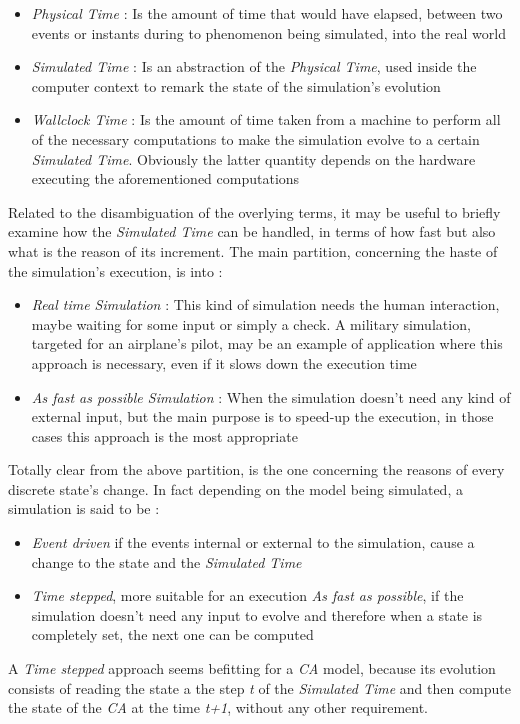 \documentclass[12pt,a4paper,fleqn]{report}
\begin{document}
\begin{itemize}
\item
\textit{Physical Time} : Is the amount of time that would have elapsed, between two events or instants during to phenomenon being simulated, into the real world
\item
\textit{Simulated Time} : Is an abstraction of the \textit{Physical Time}, used inside the computer context to remark the state of the simulation's evolution
\item
\textit{Wallclock Time} : Is the amount of time taken from a machine to perform all of the necessary computations to make the simulation evolve to a certain \textit{Simulated Time}. Obviously the latter quantity depends on the hardware executing the aforementioned computations
\end{itemize}
Related to the disambiguation of the overlying terms, it may be useful to briefly examine how the \textit{Simulated Time} can be handled, in terms of how fast but also what is the reason of its increment. The main partition, concerning the haste of the simulation's execution, is into : 
\begin{itemize}
\item
\textit{Real time Simulation} : This kind of simulation needs the human interaction, maybe waiting for some input or simply a check. A military simulation, targeted for an airplane's pilot, may be an example of application where this approach is necessary, even if it slows down the execution time
\item
\textit{As fast as possible Simulation} : When the simulation doesn't need any kind of external input, but the main purpose is to speed-up the execution, in those cases this approach is the most appropriate 
\end{itemize}
Totally clear from the above partition, is the one concerning the reasons of every discrete state's change. In fact depending on the model being simulated, a simulation is said to be :
\begin{itemize}
\item
\textit{Event driven} if the events internal or external to the simulation, cause a change to the state and the \textit{Simulated Time}
\item
\textit{Time stepped}, more suitable for an execution \textit{As fast as possible}, if the simulation doesn't need any input to evolve and therefore when a state is completely set, the next one can be computed
\end{itemize}
A \textit{Time stepped} approach seems befitting for a \textit{CA} model, because its evolution consists of reading the state a the step \textit{t} of the \textit{Simulated Time} and then compute the state of the \textit{CA} at the time \textit{t+1}, without any other requirement.
\end{document}

